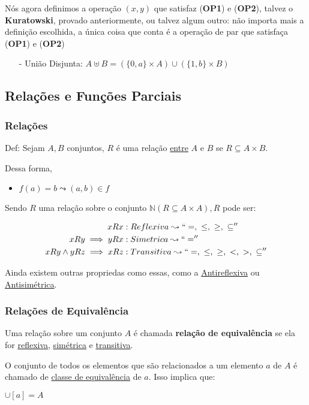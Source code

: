 \documentclass[12pt, a4paper]{article}
\begin{document}
Nós agora definimos a operação $(x,y)$ que satisfaz (\textbf{OP1}) e (\textbf{OP2}), talvez o \textbf{Kuratowski}, provado anteriormente, ou talvez algum outro: não importa mais a definição escolhida, a única coisa que conta é a operação de par que satisfaça (\textbf{OP1}) e (\textbf{OP2})

\begin{itemize}
\item[-] União Disjunta: $A \uplus B = (\{0,a\} \times A) \cup (\{1,b\} \times B)$
\end{itemize}

\subsection{Relações e Funções Parciais}

\subsubsection{Relações}

Def: Sejam $A,B$ conjuntos, $R$ é uma relação \underline{entre} $A$ e $B$ se $R \subseteq A \times B$.

Dessa forma,
\begin{itemize}
\item $f(a) = b \leadsto (a,b) \in f$
\end{itemize}

Sendo $R$ uma relação sobre o conjunto $\mathbb{N} (R \subseteq A \times A), R$ pode ser:

\begin{align*}
x R x &: Reflexiva \leadsto `` =, ~\leq, ~\geq, ~\subseteq ''\\
x R y \implies  y R x  &: Simetrica \leadsto `` =  ''\\
x R y \land y R z \implies x R z &: Transitiva \leadsto  `` =, ~\leq, ~\geq, ~<, ~>, ~\subseteq ''
\end{align*}

Ainda existem outras propriedas como essas, como a \underline{Antireflexiva} ou \underline{Antisimétrica}.

\subsubsection{Relações de Equivalência}
Uma relação sobre um conjunto $A$ é chamada \textbf{relação de equivalência} se ela for \underline{reflexiva},
\underline{simétrica} e \underline{transitiva}.

O conjunto de todos os elementos que são relacionados a um elemento $a$ de $A$ é chamado de \underline{classe de equivalência} de $a$. Isso implica que:
\begin{center}
$\cup [a] = A$
\end{center}
\end{document}
